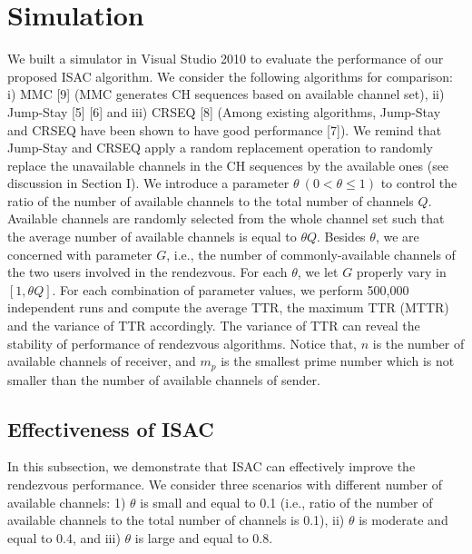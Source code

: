 \documentclass[journal]{IEEEtran}
\begin{document}
\section{Simulation}
We built a simulator in Visual Studio 2010 to evaluate the performance of our proposed ISAC algorithm. We consider the following algorithms for comparison: i) MMC [9] (MMC generates CH sequences based on available channel set), ii) Jump-Stay [5] [6] and iii) CRSEQ [8] (Among existing algorithms, Jump-Stay and CRSEQ have been shown to have good performance [7]). We remind that Jump-Stay and CRSEQ apply a random replacement operation to randomly replace the unavailable channels in the CH sequences by the available ones (see discussion in Section I). We introduce a parameter $\theta~(0<\theta\leq1)$ to control the ratio of the number of available channels to the total number of channels $Q$. Available channels are randomly selected from the whole channel set such that the average number of available channels is equal to $\theta Q$. Besides $\theta$, we are concerned with parameter $G$, i.e., the number of commonly-available channels of the two users involved in the rendezvous. For each $\theta$, we let $G$ properly vary in $[1,\theta Q]$. For each combination of parameter values, we perform 500,000 independent runs and compute the average TTR, the maximum TTR (MTTR) and the variance of TTR accordingly. The variance of TTR can reveal the stability of performance of rendezvous algorithms. Notice that, $n$ is the number of available channels of receiver, and $m_p$ is the smallest prime number which is not smaller than the number of available channels of sender.
\subsection{Effectiveness of ISAC}
In this subsection, we demonstrate that  ISAC can effectively improve the rendezvous performance. We consider three scenarios with different number of available channels: 1) $\theta$ is small and equal to 0.1 (i.e., ratio of the number of available channels to the total number of channels is 0.1), ii) $\theta$ is moderate and equal to 0.4, and iii) $\theta$ is large and equal to 0.8.
\end{document}

